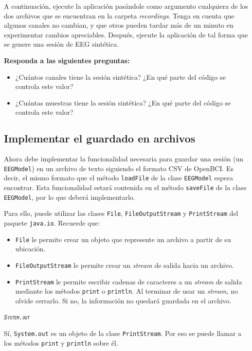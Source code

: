 \documentclass[10pt,a4paper,spanish]{article}
\newcommand{\sombreado}[2]{
  \begin{shaded}
    \begin{center} \emph{\textsc{#1}} \end{center}
    \noindent #2\\
  \end{shaded}
}
\newcommand{\code}[1]{\texttt{#1}}
\begin{document}
A continuación, ejecute la aplicación pasándole como argumento cualquiera de los dos archivos que se encuentran en la carpeta \textit{recordings}. Tenga en cuenta que algunos canales no cambian, y que otros pueden tardar más de un minuto en experimentar cambios apreciables. Después, ejecute la aplicación de tal forma que se genere una sesión de EEG sintética.

\textbf{Responda a las siguientes preguntas:}

\begin{itemize}
    \item ¿Cuántos canales tiene la sesión sintética? ¿En qué parte del código se controla este valor?
    \item ¿Cuántas muestras tiene la sesión sintética? ¿En qué parte del código se controla este valor?
\end{itemize}

\subsection{Implementar el guardado en archivos}

Ahora debe implementar la funcionalidad necesaria para guardar una sesión (un \code{EEGModel}) en un archivo de texto siguiendo el formato CSV de OpenBCI. Es decir, el mismo formato que el método \code{loadFile} de la clase \code{EEGModel} espera encontrar. Esta funcionalidad estará contenida en el método \code{saveFile} de la clase \code{EEGModel}, por lo que deberá implementarlo.

Para ello, puede utilizar las clases \code{File}, \code{FileOutputStream} y \code{PrintStream} del paquete \code{java.io}. Recuerde que:

\begin{itemize}
    \item \code{File} le permite crear un objeto que represente un archivo a partir de su ubicación. 
    \item \code{FileOutputStream} le permite crear un \textit{stream} de salida hacia un archivo.
    \item \code{PrintStream} le permite escribir cadenas de caracteres a un \textit{stream} de salida mediante los métodos \code{print} o \code{println}. Al terminar de usar un \textit{stream}, no olvide cerrarlo. Si no, la información no quedará guardada en el archivo.
\end{itemize}

\sombreado{\code{System.out}}{Sí, \code{System.out} es un objeto de la clase \code{PrintStream}. Por eso se puede llamar a los métodos \code{print} y \code{println} sobre él.}
\end{document}
